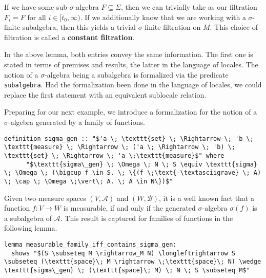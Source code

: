 If we have some sub-$\sigma$-algebra $F \subseteq \Sigma$, then we can trivially take as our filtration $F_i = F$ for all $i \in [t_0,\infty)$. If we additionally know that we are working with a $\sigma$-finite subalgebra, then this yields a trivial $\sigma$-finite filtration on $M$. This choice of filtration is called a \textbf{constant filtration}. 

\begin{remark}
	In the above lemma, both entries convey the same information. The first one is stated in terms of premises and results, the latter in the language of locales. The notion of a $\sigma$-algebra being a subalgebra is formalized via the predicate \texttt{subalgebra}. Had the formalization been done in the language of locales, we could replace the first statement with an equivalent sublocale relation.
\end{remark}

Preparing for our next example, we introduce a formalization for the notion of a $\sigma$-algebra generated by a family of functions.

\begin{isadefinition}
{\small
\begin{lstlisting}[style=isabelle]
	definition sigma_gen :: "$'a \; \texttt{set} \; \Rightarrow \; 'b \; \texttt{measure} \; \Rightarrow \; ('a \; \Rightarrow \; 'b) \; \texttt{set} \; \Rightarrow \; 'a \;\texttt{measure}$" where
	  "$\texttt{sigma\_gen} \; \Omega \; N \; S \equiv \texttt{sigma} \; \Omega \; (\bigcup f \in S. \; \{(f \;\text{-\textasciigrave} \; A) \; \cap \; \Omega \;\vert\; A. \; A \in N\})$"
  \end{lstlisting}
}
\end{isadefinition}

Given two measure spaces $(V, \mathcal{A})$ and $(W, \mathcal{B})$, it is a well known fact that a function $f : V \rightarrow W$ is measurable, if and only if the generated $\sigma$-algebra $\sigma(f)$ is a subalgebra of $\mathcal{A}$. This result is captured for families of functions in the following lemma.

\begin{isalemma}
{\small
\begin{lstlisting}[style=isabelle]
lemma measurable_family_iff_contains_sigma_gen:
  shows "$(S \subseteq M \rightarrow_M N) \longleftrightarrow S \subseteq (\texttt{space}\; M \rightarrow \;\texttt{space}\; N) \wedge \texttt{sigma\_gen} \; (\texttt{space}\; M) \; N \; S \subseteq M$"
\end{lstlisting}
}
\end{isalemma}


